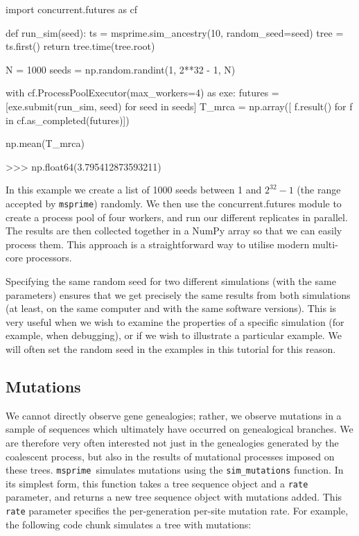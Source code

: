 \documentclass[graybox]{svmult}
\newcommand{\msprime}[0]{\texttt{msprime}}
\begin{document}
\begin{pythoncode}
import concurrent.futures as cf

def run_sim(seed):
    ts = msprime.sim_ancestry(10, random_seed=seed)
    tree = ts.first()
    return tree.time(tree.root)

N = 1000
seeds = np.random.randint(1, 2**32 - 1, N)

with cf.ProcessPoolExecutor(max_workers=4) as exe:
     futures = [exe.submit(run_sim, seed) for seed in seeds]
     T_mrca = np.array([
        f.result() for f in cf.as_completed(futures)])

np.mean(T_mrca)

>>> np.float64(3.795412873593211)
\end{pythoncode}

In this example we create a list of 1000 seeds between 1 and $2^{32} -
1$ (the range accepted by \msprime) randomly. We then use the
concurrent.futures module to create a process pool of four workers, and
run our different replicates in parallel. The results are then
collected together in a NumPy array so that we can easily process them.
This approach is a straightforward way to utilise modern
multi-core processors.

Specifying the same random seed for two different simulations (with the
same parameters) ensures that we get precisely the same results from
both simulations (at least, on the same computer and with the same
software versions). This is very useful when we wish to examine the
properties of a specific simulation (for example, when debugging), or if
we wish to illustrate a particular example. We will often set the random
seed in the examples in this tutorial for this reason.

\subsection{Mutations}\label{mutations}

We cannot directly observe gene genealogies; rather, we observe mutations in a
sample of sequences which ultimately have occurred on genealogical branches. We
are therefore very often interested not just in the genealogies generated by
the coalescent process, but also in the results of mutational processes imposed
on these trees. \msprime\ simulates mutations using the \texttt{sim\_mutations}
function. In its simplest form, this function takes a tree sequence object and
a \texttt{rate} parameter, and returns a new tree sequence object with
mutations added. This \texttt{rate} parameter specifies the per-generation
per-site mutation rate. For example, the following code chunk simulates a tree
with mutations:
\end{document}

